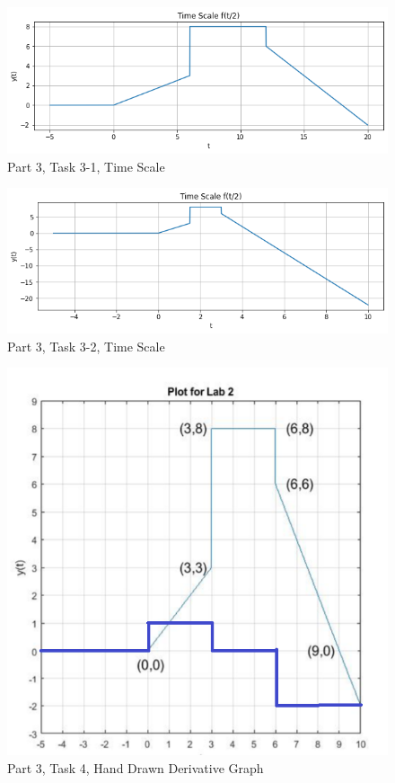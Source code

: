 \documentclass[12pt]{report}
\begin{document}
{\begin{figure}[h!]
\begin{center}
\caption{Part 3, Task 3-1, Time Scale}
\includegraphics[scale=0.65]{Task3_1.png}
\end{center}
\end{figure}

\begin{figure}[h!]
\begin{center}
\caption{Part 3, Task 3-2, Time Scale}
\includegraphics[scale=0.55]{Task3_2.png}
\end{center}
\end{figure}

\begin{figure}[h!]
\begin{center}
\caption{Part 3, Task 4, Hand Drawn Derivative Graph}
\includegraphics[scale=0.65]{DerivativePlot.png}
\end{center}
\end{figure}

}
\end{document}
